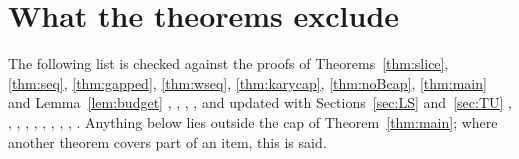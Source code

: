 \documentclass[10pt,reqno]{amsart}
\theoremstyle{definition}
\theoremstyle{remark}
\begin{document}
\section{What the theorems exclude}\label{sec:excluded}

The following list is checked against the proofs of
Theorems~\ref{thm:slice}, \ref{thm:seq}, \ref{thm:gapped},
\ref{thm:wseq}, \ref{thm:karycap}, \ref{thm:noBcap}, \ref{thm:main} and
Lemma~\ref{lem:budget} \cite[\S6.1]{ET}, \cite[\S4.3]{KA}, \cite[\S6]{NC},
\cite[\S6]{KA2}, and updated with Sections~\ref{sec:LS}
and~\ref{sec:TU} \cite[\S7]{LS}, \cite[\S0]{LS2}, \cite[\S4]{LS3}, \cite[\S5]{LS4}, \cite[\S0]{IF2},
\cite[\S4]{SPW}, \cite[\S1]{SPW2},
\cite[\S6]{TU}, \cite[\S0]{TU2}, \cite[\S5]{KA3}.  Anything below lies outside
the cap of Theorem~\ref{thm:main}; where another theorem covers part of an
item, this is said.
\end{document}
